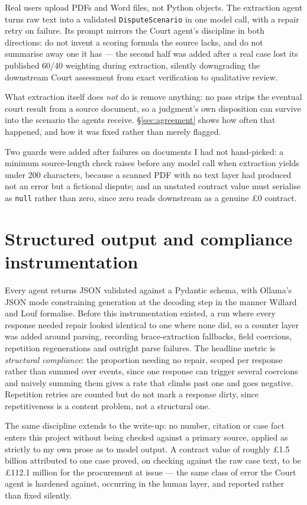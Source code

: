 Real users upload PDFs and Word files, not Python objects. The extraction
agent turns raw text into a validated \texttt{DisputeScenario} in one model
call, with a repair retry on failure. Its prompt mirrors the Court agent's
discipline in both directions: do not invent a scoring formula the source
lacks, and do not summarise away one it has --- the second half was added
after a real case lost its published 60/40 weighting during extraction,
silently downgrading the downstream Court assessment from exact
verification to qualitative review.

What extraction itself does \emph{not} do is remove anything: no pass
strips the eventual court result from a source document, so a judgment's
own disposition can survive into the scenario the agents receive.
\S\ref{sec:agreement} shows how often that happened, and how it was fixed
rather than merely flagged.

Two guards were added after failures on documents I had not hand-picked: a
minimum source-length check raises before any model call when extraction
yields under 200 characters, because a scanned PDF with no text layer had
produced not an error but a fictional dispute; and an unstated contract
value must serialise as \texttt{null} rather than zero, since zero reads
downstream as a genuine \pounds0 contract.

\section{Structured output and compliance instrumentation}
\label{sec:compliance-method}

Every agent returns JSON validated against a Pydantic schema, with Ollama's
JSON mode constraining generation at the decoding step in the manner
Willard and Louf \cite{willard2023guided} formalise. Before this
instrumentation existed, a run where every response needed repair looked
identical to one where none did, so a counter layer was added around
parsing, recording brace-extraction fallbacks, field coercions, repetition
regenerations and outright parse failures. The headline metric is
\emph{structural compliance}: the proportion needing no repair, scoped per
response rather than summed over events, since one response can trigger
several coercions and naively summing them gives a rate that climbs past
one and goes negative. Repetition retries are counted but do not mark a
response dirty, since repetitiveness is a content problem, not a
structural one.

The same discipline extends to the
write-up:\label{sec:verification-discipline} no number, citation or case
fact enters this project without being checked against a primary source,
applied as strictly to my own prose as to model output. A contract value of
roughly \pounds1.5 billion attributed to one case proved, on checking
against the raw case text, to be \pounds112.1 million for the procurement at
issue --- the same class of error the Court agent is hardened against,
occurring in the human layer, and reported rather than fixed silently.

